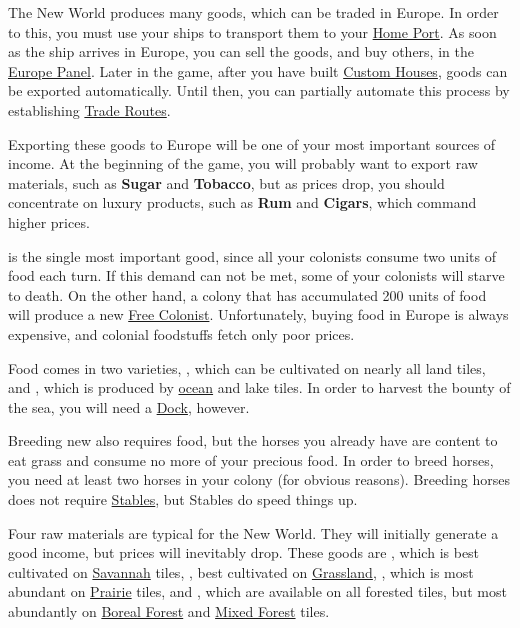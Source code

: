 \documentclass[12pt]{article}
\begin{document}
The New World produces many goods, which can be traded in Europe. In
order to this, you must use your ships to transport them to your
\hyperlink{Home Port}{Home Port}. As soon as the ship arrives in
Europe, you can sell the goods, and buy others, in the
\hyperlink{europe panel}{Europe Panel}. Later in the game, after you
have built \hyperlink{Custom House}{Custom Houses}, goods can be
exported automatically. Until then, you can partially automate this
process by establishing \hyperlink{Trade Routes}{Trade Routes}.

Exporting these goods to Europe will be one of your most important
sources of income. At the beginning of the game, you will probably
want to export raw materials, such as \textbf{Sugar} and
\textbf{Tobacco}, but as prices drop, you should concentrate on luxury
products, such as \textbf{Rum} and \textbf{Cigars}, which command
higher prices.

 is the single most important good, since all your
colonists consume two units of food each turn. If this demand can not
be met, some of your colonists will starve to death.  On the other
hand, a colony that has accumulated 200 units of food will produce a
new \hyperlink{Free Colonist}{Free Colonist}. Unfortunately, buying
food in Europe is always expensive, and colonial foodstuffs fetch only
poor prices.

Food comes in two varieties, , which can be cultivated on
nearly all land tiles, and , which is produced by
\hyperlink{Ocean}{ocean} and lake tiles. In order to harvest the
bounty of the sea, you will need a \hyperlink{Dock}{Dock}, however.

Breeding new  also requires food, but the horses you
already have are content to eat grass and consume no more of your
precious food. In order to breed horses, you need at least two horses
in your colony (for obvious reasons). Breeding horses does not require
\hyperlink{Stables}{Stables}, but Stables do speed things up.

Four raw materials are typical for the New World. They will initially
generate a good income, but prices will inevitably drop. These goods
are , which is best cultivated on
\hyperlink{Savannah}{Savannah} tiles, , best cultivated
on \hyperlink{Grassland}{Grassland}, , which is most
abundant on \hyperlink{Prairie}{Prairie} tiles, and ,
which are available on all forested tiles, but most abundantly on
\hyperlink{Boreal Forest}{Boreal Forest} and \hyperlink{Mixed
Forest}{Mixed Forest} tiles.
\end{document}

